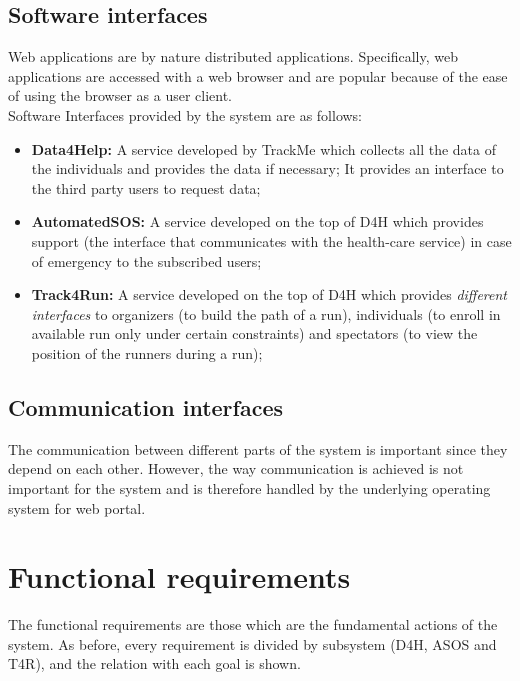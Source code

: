 \documentclass[hidelinks, 12pt]{report}
\begin{document}
	\subsection{Software interfaces}
	Web applications are by nature distributed applications. Specifically, web applications are accessed with a web browser and are popular because of the ease of using the browser as a user client.\\
	Software Interfaces provided by the system are as follows:
	\begin{itemize}
		\item{} \textbf{Data4Help:} A service developed by TrackMe which collects all the data of the individuals and provides the data if necessary; It provides an interface to the third party users to request data;
		\item{} \textbf{AutomatedSOS:} A service developed on the top of D4H which provides support (the interface that communicates with the health-care service) in case of emergency to the subscribed users;
		\item{} \textbf{Track4Run:} A service developed on the top of D4H  which provides \textit{different interfaces} to organizers (to build the path of a run), individuals (to enroll in available run only under certain constraints) and spectators (to view the position of the runners during a run);
	\end{itemize}
	
	\subsection{Communication interfaces}
	The communication between different parts of the system is important since they depend on each other. However, the way communication is achieved is not important for the system and is therefore handled by the underlying operating system for web portal.
	
	\section{Functional requirements}
	The functional requirements are those which are the fundamental actions of the system. As before, every requirement is divided by subsystem (D4H, ASOS and T4R), and the relation with each goal is shown.
	
\end{document}
